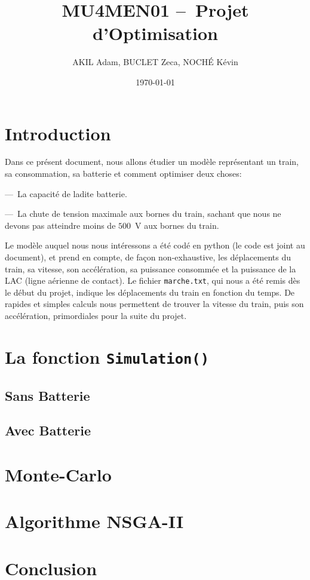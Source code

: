 \documentclass[11pt, a4paper, oneside, portrait]{report}
\title{\textbf{MU4MEN01 --~Projet d'Optimisation}}
\author{AKIL Adam, BUCLET Zeca, NOCHÉ Kévin} %
\date{\today}
\begin{document}
    \maketitle\thispagestyle{empty} %
    \newpage\tableofcontents\thispagestyle{empty}

    \newpage\setcounter{page}{1} %


    \section*{Introduction}
        Dans ce présent document, nous allons étudier un modèle représentant un train, sa consommation, sa batterie et comment optimiser deux choses:

        ---~La capacité de ladite batterie.

        ---~La chute de tension maximale aux bornes du train, sachant que nous ne devons pas atteindre moins de $500$~V aux bornes du train.

        Le modèle auquel nous nous intéressons a été codé en python (le code est joint au document), et prend en compte, de façon non-exhaustive, les déplacements du train, sa vitesse, son accélération, sa puissance consommée et la puissance de la LAC (ligne aérienne de contact).
        Le fichier \texttt{marche.txt}, qui nous a été remis dès le début du projet, indique les déplacements du train en fonction du temps.
        De rapides et simples calculs nous permettent de trouver la vitesse du train, puis son accélération, primordiales pour la suite du projet.

    \section*{La fonction \texttt{Simulation()}}
        \subsection*{Sans Batterie}
        \subsection*{Avec Batterie}


    \section*{Monte-Carlo}


    \section*{Algorithme NSGA-II}


    \section*{Conclusion}
\end{document}
